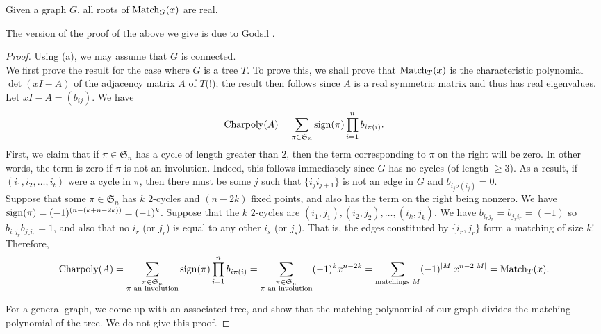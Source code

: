 
	\begin{ftheo}
		\label{theo: roots of matching polynomial real}
		Given a graph $G$, all roots of $\operatorname{Match}_G(x)$ are real.
	\end{ftheo}
	The version of the proof of the above we give is due to Godsil \cite{godsil-matching-poly-real-roots}.
	\begin{proof}
		Using (a), we may assume that $G$ is connected.\\
		We first prove the result for the case where $G$ is a tree $T$. To prove this, we shall prove that $\operatorname{Match}_T(x)$ is the characteristic polynomial $\det(xI-A)$ of the adjacency matrix $A$ of $T$(!); the result then follows since $A$ is a real symmetric matrix and thus has real eigenvalues.\\
		Let $xI - A = (b_{ij})$. We have
		\[ \operatorname{Charpoly}(A) = \sum_{\pi \in \mathfrak{S}_n} \operatorname{sign}(\pi) \prod_{i=1}^n b_{i\pi(i)}. \]
		First, we claim that if $\pi \in \mathfrak{S}_n$ has a cycle of length greater than $2$, then the term corresponding to $\pi$ on the right will be zero. In other words, the term is zero if $\pi$ is not an involution. Indeed, this follows immediately since $G$ has no cycles (of length $\ge 3$). As a result, if $(i_1,i_2,\ldots,i_t)$ were a cycle in $\pi$, then there must be some $j$ such that $\{i_j i_{j+1}\}$ is not an edge in $G$ and $b_{i_j \sigma(i_j)} = 0$.\\
		Suppose that some $\pi \in \mathfrak{S}_n$ has $k$ $2$-cycles and $(n-2k)$ fixed points, and also has the term on the right being nonzero. We have $\operatorname{sign}(\pi) = (-1)^{(n- (k + n-2k))} = (-1)^k$. Suppose that the $k$ $2$-cycles are $(i_1,j_1),(i_2,j_2),\ldots,(i_k,j_k)$. We have $b_{i_rj_r} = b_{j_ri_r} = (-1)$ so $b_{i_rj_r}b_{j_ri_r} = 1$, and also that no $i_r$ (or $j_r$) is equal to any other $i_s$ (or $j_s$). That is, the edges constituted by $\{i_r,j_r\}$ form a matching of size $k$! Therefore,
		\[ \operatorname{Charpoly}(A) = \sum_{\substack{\pi \in \mathfrak{S}_n \\ \text{$\pi$ an involution}}} \operatorname{sign}(\pi) \prod_{i=1}^n b_{i\pi(i)} = \sum_{\substack{\pi \in \mathfrak{S}_n \\ \text{$\pi$ an involution}}} (-1)^k x^{n-2k} = \sum_{\text{matchings $M$}} (-1)^{|M|} x^{n-2|M|} = \operatorname{Match}_T(x). \]

		For a general graph, we come up with an associated tree, and show that the matching polynomial of our graph divides the matching polynomial of the tree. We do not give this proof.
	\end{proof}


